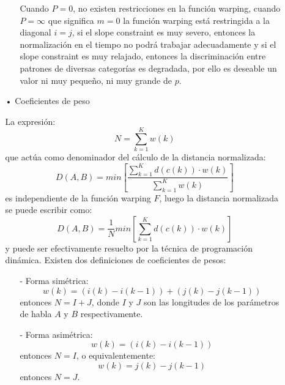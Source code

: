 \begin{enumerate}
\begin{enumerate}
\begin{enumerate}
Cuando $P = 0$, no existen restricciones en la función warping, cuando $P = \infty$ que significa $m = 0$ la función warping está restringida a la diagonal $i = j$, si el slope constraint es muy severo, entonces la normalización en el tiempo no podrá trabajar adecuadamente y si el slope constraint es muy relajado, entonces la discriminación entre patrones de diversas categorías es degradada, por ello es deseable un valor ni muy pequeño, ni muy grande de $p$.
\end{enumerate}

\item[•]Coeficientes de peso
\par
La expresión:
\begin{equation}
\label{eq:ecuacion86}
N = \sum_{k=1}^{K}w(k)
\end{equation}
que actúa como denominador del cálculo de la distancia normalizada:
\begin{equation}
\label{eq:ecuacion87}
D(A,B) = min\left [ \frac{\sum_{k=1}^{K}d(c(k))\cdot w(k)}{\sum_{k=1}^{K}w(k)} \right ]
\end{equation}
es independiente de la función warping $F$, luego la distancia normalizada se puede escribir como:
\begin{equation}
\label{eq:ecuacion88}
D(A,B) = \frac{1}{N} min\left [ \sum_{k=1}^{K}d(c(k))\cdot w(k) \right ]
\end{equation}
y puede ser efectivamente resuelto por la técnica de programación dinámica. Existen dos definiciones de coeficientes de pesos:

\begin{enumerate}
\item[-]Forma simétrica:
\begin{equation}
\label{eq:ecuacion89}
w(k) = (i(k) - i(k - 1)) + (j(k) - j(k - 1))
\end{equation}
entonces $N = I + J$, donde $I$ y $J$ son las longitudes de los parámetros de habla $A$ y $B$ respectivamente.
\item[-]Forma asimétrica:
\begin{equation}
\label{eq:ecuacion90}
w(k) = (i(k) - i(k-1))
\end{equation}
entonces $N = I$, o equivalentemente:
\begin{equation}
\label{eq:ecuacion91}
w(k) = j(k) - j(k - 1)
\end{equation}
\vskip -0.2cm
entonces $N = J$.
\end{enumerate}


\end{enumerate}
\end{enumerate}
